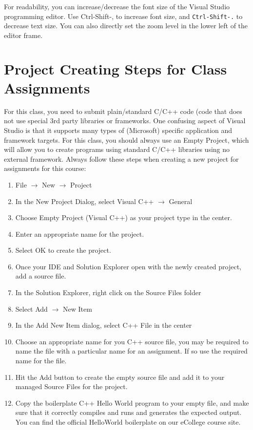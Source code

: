 \documentclass[11pt]{article}
\begin{document}
For readability, you can increase/decrease the font size of the Visual
Studio programming editor. Use Ctrl-Shift-, to increase font size,
and \verb~Ctrl-Shift-.~ to decrease text size.  You can also directly set
the zoom level in the lower left of the editor frame.
\section{Project Creating Steps for Class Assignments}
\label{sec-7}

For this class, you need to submit plain/standard C/C++ code (code that does not use special 3rd party libraries
or frameworks.  One confusing aspect of Visual Studio is that it supports many types of (Microsoft) specific
application and framework targets.  For this class, you should always use an Empty Project, which will allow
you to create programs using standard C/C++ libraries using no external framework.  Always follow these
steps when creating a new project for assignments for this course:

\begin{enumerate}
\item File $\rightarrow$ New $\rightarrow$ Project
\item In the New Project Dialog, select Visual C++ $\rightarrow$ General
\item Choose Empty Project (Visual C++) as your project type in the center.
\item Enter an appropriate name for the project.
\item Select OK to create the project.
\item Once your IDE and Solution Explorer open with the newly created project, add a source file.
\item In the Solution Explorer, right click on the Source Files folder
\item Select Add $\rightarrow$ New Item
\item In the Add New Item dialog, select C++ File in the center
\item Choose an appropriate name for you C++ source file, you may be required to name the file with a particular name for an assignment.  If so use the required name for the file.
\item Hit the Add button to create the empty source file and add it to your managed Source Files for the project.
\item Copy the boilerplate C++ Hello World program to your empty file, and make sure that it correctly compiles and runs and generates the expected output.  You can find the official HelloWorld boilerplate on our eCollege course site.
\end{enumerate}
\end{document}
